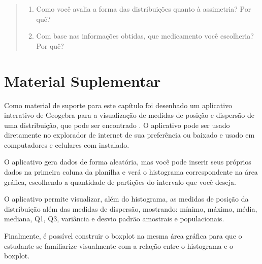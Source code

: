 \begin{enumerate}
\begin{quote}
\begin{enumerate}
\item {} 
Como você avalia a forma das distribuições quanto à assimetria? Por quê?

\item {} 
Com base nas informações obtidas, que medicamento você escolheria? Por quê?

\end{enumerate}
\end{quote}
\end{enumerate}





\section{Material Suplementar}
\label{\detokenize{PE104-E:material-suplementar}}\label{\detokenize{PE104-E:sec-applet-medidas}}
Como material de suporte para este capítulo foi desenhado um aplicativo interativo de Geogebra para a visualização de medidas de posição e dispersão de uma distribuição, que pode ser encontrado . O aplicativo pode ser usado diretamente no explorador de internet de sua preferência ou baixado e usado em computadores e celulares com  instalado.

O aplicativo gera dados de forma aleatória, mas você pode inserir seus próprios dados na primeira coluna da planilha e verá o histograma correspondente na área gráfica, escolhendo a quantidade de partições do intervalo que você deseja.

O aplicativo permite visualizar, além do histograma, as medidas de posição da distribuição além das medidas de dispersão, mostrando: mínimo, máximo, média, mediana, Q1, Q3, variância e desvio padrão amostrais e populacionais.

Finalmente, é possível construir o boxplot na mesma área gráfica para que o estudante se familiarize visualmente com a relação entre o histograma e o boxplot.

\begin{figure}[H]
\centering
\capstart

\noindent{}
\caption{}\label{\detokenize{PE104-E:fig-aplicativo-medidas}}\label{\detokenize{PE104-E:id17}}\end{figure}



